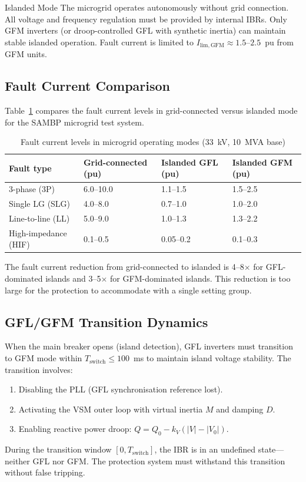 \begin{thesisdef}{Islanded Mode}
The microgrid operates autonomously without grid connection. All voltage
and frequency regulation must be provided by internal IBRs. Only GFM
inverters (or droop-controlled GFL with synthetic inertia) can maintain
stable islanded operation. Fault current is limited to $I_\mathrm{lim,GFM}
\approx 1.5$--$2.5$~pu from GFM units.
\end{thesisdef}

\subsection{Fault Current Comparison}

Table~\ref{tab:ch6_fault_comparison} compares the fault current levels
in grid-connected versus islanded mode for the SAMBP microgrid test system.

\begin{table}[htbp]
\caption{Fault current levels in microgrid operating modes (33~kV, 10~MVA base)}
\label{tab:ch6_fault_comparison}
\begin{tabularx}{\textwidth}{@{}lXXX@{}}
\toprule
Fault type & Grid-connected (pu) & Islanded GFL (pu) & Islanded GFM (pu) \\
\midrule
3-phase (3P)       & 6.0--10.0 & 1.1--1.5 & 1.5--2.5 \\
Single LG (SLG)    & 4.0--8.0  & 0.7--1.0 & 1.0--2.0 \\
Line-to-line (LL)  & 5.0--9.0  & 1.0--1.3 & 1.3--2.2 \\
High-impedance (HIF) & 0.1--0.5 & 0.05--0.2 & 0.1--0.3 \\
\bottomrule
\end{tabularx}
\end{table}

The fault current reduction from grid-connected to islanded is 4--8$\times$
for GFL-dominated islands and 3--5$\times$ for GFM-dominated islands.
This reduction is too large for the protection to accommodate with a
single setting group.

\subsection{GFL/GFM Transition Dynamics}

When the main breaker opens (island detection), GFL inverters must
transition to GFM mode within $T_\mathrm{switch} \leq 100$~ms to
maintain island voltage stability. The transition involves:
\begin{enumerate}
\item Disabling the PLL (GFL synchronisation reference lost).
\item Activating the VSM outer loop with virtual inertia $M$ and damping $D$.
\item Enabling reactive power droop: $Q = Q_0 - k_V(|V| - |V_0|)$.
\end{enumerate}
During the transition window $[0, T_\mathrm{switch}]$, the IBR is in
an undefined state—neither GFL nor GFM. The protection system must
withstand this transition without false tripping.


